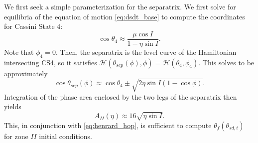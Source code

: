 \documentclass[
        fleqn,
        usenatbib,
    ]{mnras}
\newcommand*{\p}[1]{\left(#1\right)}
\begin{document}
We first seek a simple parameterization for the separatrix. We first solve for
equilibria of the equation of motion \autoref{eq:dsdt_base} to compute the
coordinates for Cassini State 4:
\begin{equation}
    \cos \theta_4 \approx \frac{\mu \cos I}{1 - \eta \sin I}.
\end{equation}
Note that $\phi_4 = 0$. Then, the separatrix is the level curve of the
Hamiltonian intersecting CS4, so it satisfies $\mathcal{H}\p{\theta_{sep}(\phi),
\phi} = \mathcal{H}\p{\theta_4, \phi_4}$. This solves to be approximately
\begin{equation}
    \cos \theta_{sep}(\phi) \approx \cos \theta_4 \pm
        \sqrt{2\eta \sin I\p{1 - \cos \phi}}.
\end{equation}
Integration of the phase area enclosed by the two legs of the separatrix then
yields
\begin{equation}
    A_{II}(\eta) \approx 16\sqrt{\eta \sin I}.\label{eq:a_approx}
\end{equation}
This, in conjunction with \autoref{eq:henrard_hop}, is sufficient to compute
$\theta_f\p{\theta_{sd, i}}$ for zone $II$ initial conditions.
\end{document}
